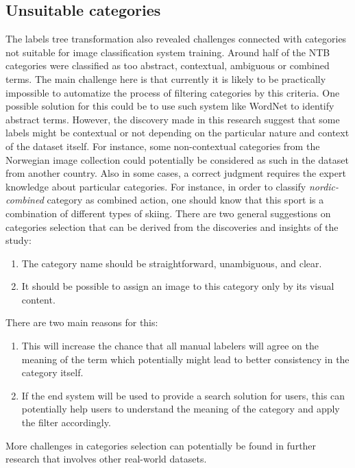 \subsection{Unsuitable categories}
The labels tree transformation also revealed challenges connected with categories not suitable for image classification system training. Around half of the NTB categories were classified as too abstract, contextual, ambiguous or combined terms. The main challenge here is that currently it is likely to be practically impossible to automatize the process of filtering categories by this criteria. One possible solution for this could be to use such system like WordNet to identify abstract terms. However, the discovery made in this research suggest that some labels might be contextual or not depending on the particular nature and context of the dataset itself. For instance, some non-contextual categories from the Norwegian image collection could potentially be considered as such in the dataset from another country. Also in some cases, a correct judgment requires the expert knowledge about particular categories. For instance, in order to classify \textit{nordic-combined} category as combined action, one should know that this sport is a combination of different types of skiing. There are two general suggestions on categories selection that can be derived from the discoveries and insights of the study:

\begin{enumerate}
    \item The category name should be straightforward, unambiguous, and clear.
    \item It should be possible to assign an image to this category only by its visual content.
\end{enumerate}

There are two main reasons for this:

\begin{enumerate}
    \item This will increase the chance that all manual labelers will agree on the meaning of the term which potentially might lead to better consistency in the category itself.
    \item If the end system will be used to provide a search solution for users, this can potentially help users to understand the meaning of the category and apply the filter accordingly.
\end{enumerate}

More challenges in categories selection can potentially be found in further research that involves other real-world datasets.

